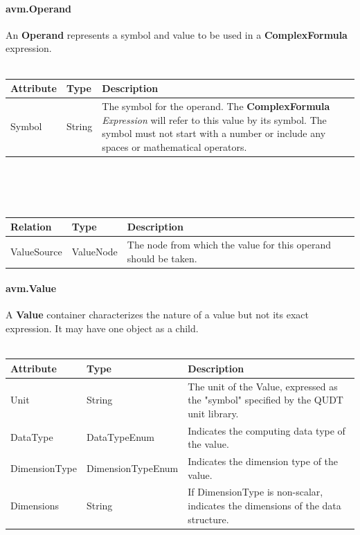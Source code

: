 \paragraph{avm.Operand}
An \textbf{Operand} represents a symbol and value to be used in a \textbf{ComplexFormula} expression.
\\ \\
\begin{tabular}{ l l p{9.5cm} }
\textbf{Attribute} & \textbf{Type} & \textbf{Description} \\ \hline
Symbol & String & The symbol for the operand. The \textbf{ComplexFormula} \textit{Expression} will refer to this value by its symbol. The symbol must not start with a number or include any spaces or mathematical operators. \\ \hline
\end{tabular}
\\ \\ \\
\begin{tabular}{ l l p{10cm} }
\textbf{Relation} & \textbf{Type} & \textbf{Description} \\ \hline
ValueSource & ValueNode & The node from which the value for this operand should be taken. \\ \hline
\end{tabular}




\paragraph{avm.Value}
A \textbf{Value} container characterizes the nature of a value but not its exact expression. It may have one  object as a child.
\\ \\
\begin{tabular}{ l l p{9.5cm} }
\textbf{Attribute} & \textbf{Type} & \textbf{Description} \\ \hline
Unit & String & The unit of the Value, expressed as the "symbol" specified by the QUDT unit library. \\ \hline
DataType & DataTypeEnum & Indicates the computing data type of the value. \\ \hline
DimensionType & DimensionTypeEnum & Indicates the dimension type of the value. \\ \hline
Dimensions & String & If DimensionType is non-scalar, indicates the dimensions of the data structure. \\ \hline
\end{tabular}

